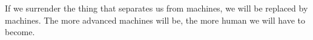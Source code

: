 If we surrender the thing that separates us from machines, we will be replaced by
machines. The more advanced machines will be, the more human we will have to
become.
